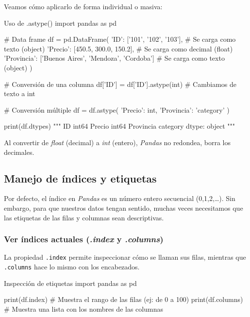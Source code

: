 Veamos cómo aplicarlo de forma individual o masiva:

\begin{pycode}{Uso de .astype()}
import pandas as pd

# Data frame
df = pd.DataFrame({
'ID': ['101', '102', '103'], # Se carga como texto (object)
'Precio': [450.5, 300.0, 150.2],     # Se carga como decimal (float)
'Provincia': ['Buenos Aires', 'Mendoza', 'Cordoba'] # Se carga como texto (object)
})

# Conversión de una columna
df['ID'] = df['ID'].astype(int) # Cambiamos de texto a int

# Conversión múltiple
df = df.astype({
'Precio': int,
'Provincia': 'category'
})

print(df.dtypes)
"""
ID           int64
Precio       int64
Provincia    category
dtype: object
"""
\end{pycode}

\begin{nota}
    Al convertir de \textit{float} (decimal) a \textit{int} (entero), \textit{Pandas} no redondea, borra los decimales.
\end{nota}





\subsection{Manejo de índices y etiquetas}

Por defecto, el índice en \textit{Pandas} es un número entero secuencial (0,1,2,…). Sin embargo, para que nuestros datos tengan sentido, muchas veces necesitamos que las etiquetas de las filas y columnas sean descriptivas.

\subsubsection{Ver índices actuales (\textit{.index} y \textit{.columns})}

La propiedad \texttt{.index} permite inspeccionar cómo se llaman sus filas, mientras que \texttt{.columns} hace lo mismo con los encabezados. 

\begin{pycode}{Inspección de etiquetas}
import pandas as pd

print(df.index) #  Muestra el rango de las filas (ej: de 0 a 100)
print(df.columns) # Muestra una lista con los nombres de las columnas
\end{pycode}

